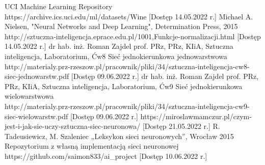 \documentclass[12pt,twoside]{article}
\begin{document}
\clearpage



\begin{thebibliography}{4}
 UCI Machine Learning Repository\\https://archive.ics.uci.edu/ml/datasets/Wine [Dostęp 14.05.2022 r.]
 Michael A. Nielsen, "Neural Networks and Deep Learning", Determination Press, 2015
 http://sztuczna-inteligencja.eprace.edu.pl/1001,Funkcje-normalizacji.html [Dostęp 14.05.2022 r.]
dr hab. inż. Roman Zajdel prof. PRz, PRz, KIiA, Sztuczna inteligencja, Laboratorium, Ćw8 Sieć jednokierunkowa jednowarstwowa\\
http://materialy.prz-rzeszow.pl/pracownik/pliki/34/sztuczna-inteligencja-cw8-siec-jednowarstw.pdf [Dostęp 09.06.2022 r.]
dr hab. inż. Roman Zajdel prof. PRz, PRz, KIiA, Sztuczna inteligencja, Laboratorium, Ćw9 Sieć jednokierunkowa wielowarstwowa\\
http://materialy.prz-rzeszow.pl/pracownik/pliki/34/sztuczna-inteligencja-cw9-siec-wielowarstw.pdf [Dostęp 09.06.2022 r.]
https://miroslawmamczur.pl/czym-jest-i-jak-sie-uczy-sztuczna-siec-neuronowa/ [Dostęp 21.05.2022 r.]
 R. Tadeusiewicz, M. Szaleniec „Leksykon sieci neuronowych”, Wrocław 2015
 Repozytorium z własną implementacją sieci neuronowej\\ https://github.com/saimon833/ai\_project [Dostęp 10.06.2022 r.]


\end{thebibliography}

\clearpage
\end{document}
